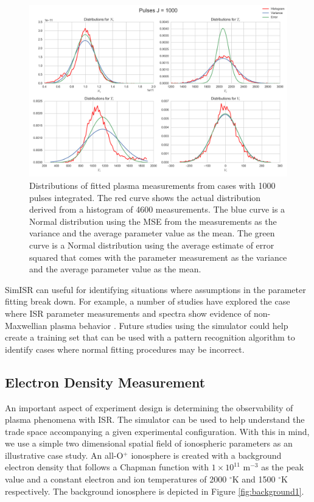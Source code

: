 \documentclass[draft,ras]{agutex}
\begin{document}
\begin{article}
\begin{figure}[!t]
\centering
\includegraphics[width=5in]{histsingle}
\caption{Distributions of fitted plasma measurements from cases with 1000 pulses integrated. The red curve shows the actual distribution derived from a histogram of 4600 measurements. The blue curve is a Normal distribution using the MSE from the measurements as the variance and the average parameter value as the mean.  The green curve is a Normal distribution using the average estimate of error squared that comes with the parameter measurement as the variance and the average parameter value as the mean.}
\label{fig:statshistsingle}
\end{figure}


SimISR can useful for identifying situations where assumptions in the parameter fitting break down. For example, a number of studies have explored the case where ISR parameter measurements and spectra show evidence of non-Maxwellian plasma behavior \citep[see, e.g.,][for AMISR examples]{Akbari:2012dz,Akbari:2015fv}. Future studies using the simulator could help create a training set that can be used with a pattern recognition algorithm to identify cases where normal fitting procedures may be incorrect.

\subsection{Electron Density Measurement}
An important aspect of experiment design is determining the observability of plasma phenomena with ISR. The simulator can be used to help understand the trade space accompanying a given experimental configuration. With this in mind, we use a simple two dimensional spatial field of ionospheric parameters as an illustrative case study. An all-O$^+$ ionosphere is created with a background electron density that follows a Chapman function with $1\times10^{11}$ m$^{-3}$ as the peak value and a constant electron and ion temperatures of 2000 $^\circ$K and 1500 $^\circ$K respectively. The background ionosphere is depicted in Figure \ref{fig:background1}.


\end{article}
\end{document}
